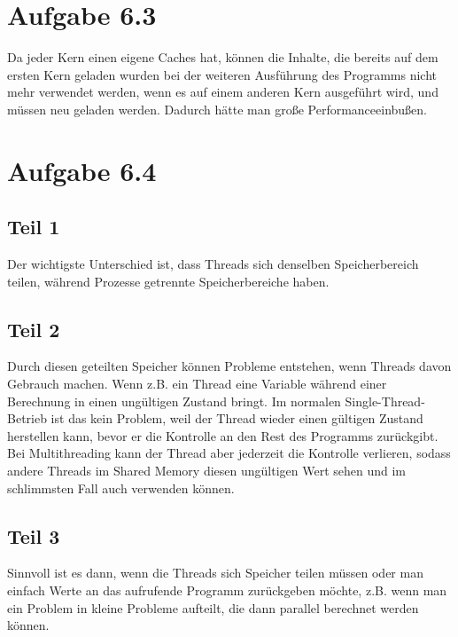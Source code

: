 \documentclass[10pt,a4paper]{article}
\begin{document}
\section*{Aufgabe 6.3}

Da jeder Kern einen eigene Caches hat, können die Inhalte, die bereits auf dem ersten Kern geladen wurden bei der weiteren Ausführung des Programms nicht mehr verwendet werden, wenn es auf einem anderen Kern ausgeführt wird, und müssen neu geladen werden.
Dadurch hätte man große Performanceeinbußen.

\section*{Aufgabe 6.4}

\subsection*{Teil 1}

Der wichtigste Unterschied ist, dass Threads sich denselben Speicherbereich teilen, während Prozesse getrennte Speicherbereiche haben.

\subsection*{Teil 2}

Durch diesen geteilten Speicher können Probleme entstehen, wenn Threads davon Gebrauch machen.
Wenn z.B. ein Thread eine Variable während einer Berechnung in einen ungültigen Zustand bringt.
Im normalen Single-Thread-Betrieb ist das kein Problem, weil der Thread wieder einen gültigen Zustand herstellen kann, bevor er die Kontrolle an den Rest des Programms zurückgibt.
Bei Multithreading kann der Thread aber jederzeit die Kontrolle verlieren, sodass andere Threads im Shared Memory diesen ungültigen Wert sehen und im schlimmsten Fall auch verwenden können.

\subsection*{Teil 3}

Sinnvoll ist es dann, wenn die Threads sich Speicher teilen müssen oder man einfach Werte an das aufrufende Programm zurückgeben möchte, z.B. wenn man ein Problem in kleine Probleme aufteilt, die dann parallel berechnet werden können.
\end{document}
